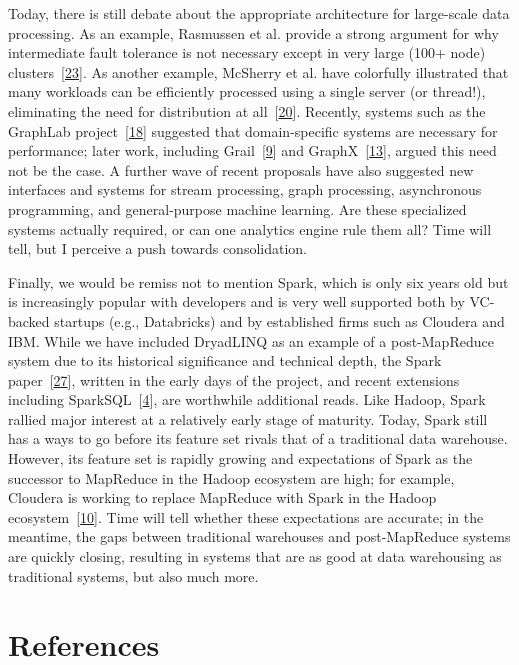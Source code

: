 \documentclass[b5paper,11pt,twoside,openright]{book}
\begin{document}
Today, there is still debate about the appropriate architecture for
large-scale data processing. As an example, Rasmussen et al. provide a
strong argument for why intermediate fault tolerance is not necessary
except in very large (100+ node)
clusters~{{[}\protect\hyperlink{ref-themismr}{23}{]}}. As another
example, McSherry et al. have colorfully illustrated that many workloads
can be efficiently processed using a single server (or thread!),
eliminating the need for distribution at
all~{{[}\protect\hyperlink{ref-cost}{20}{]}}. Recently, systems such as
the GraphLab project~{{[}\protect\hyperlink{ref-graphlab}{18}{]}}
suggested that domain-specific systems are necessary for performance;
later work, including Grail~{{[}\protect\hyperlink{ref-grail}{9}{]}} and
GraphX~{{[}\protect\hyperlink{ref-graphx}{13}{]}}, argued this need not
be the case. A further wave of recent proposals have also suggested new
interfaces and systems for stream processing, graph processing,
asynchronous programming, and general-purpose machine learning. Are
these specialized systems actually required, or can one analytics engine
rule them all? Time will tell, but I perceive a push towards
consolidation.

Finally, we would be remiss not to mention Spark, which is only six
years old but is increasingly popular with developers and is very well
supported both by VC-backed startups (e.g., Databricks) and by
established firms such as Cloudera and IBM. While we have included
DryadLINQ as an example of a post-MapReduce system due to its historical
significance and technical depth, the Spark
paper~{{[}\protect\hyperlink{ref-spark}{27}{]}}, written in the early
days of the project, and recent extensions including
SparkSQL~{{[}\protect\hyperlink{ref-sparksql}{4}{]}}, are worthwhile
additional reads. Like Hadoop, Spark rallied major interest at a
relatively early stage of maturity. Today, Spark still has a ways to go
before its feature set rivals that of a traditional data warehouse.
However, its feature set is rapidly growing and expectations of Spark as
the successor to MapReduce in the Hadoop ecosystem are high; for
example, Cloudera is working to replace MapReduce with Spark in the
Hadoop ecosystem~{{[}\protect\hyperlink{ref-cloudera-spark}{10}{]}}.
Time will tell whether these expectations are accurate; in the meantime,
the gaps between traditional warehouses and post-MapReduce systems are
quickly closing, resulting in systems that are as good at data
warehousing as traditional systems, but also much more.

\section*{References}
\end{document}
